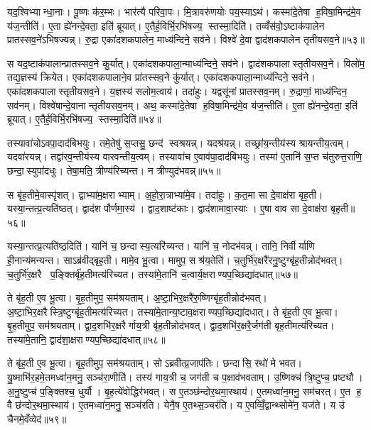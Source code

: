 यद॒श्विभ्यान्धा॒नाः। पू॒ष्णः क॑र॒म्भः। भार॑त्यै परिवा॒पः। मि॒त्रावरु॑णयोः पय॒स्याऽथ॑। कस्मा॑दे॒तेषा ह॒विषा॒मिन्द्र॑मे॒व य॑ज॒न्तीति॑। ए॒ता ह्ये॑नन्दे॒वता॒ इति॑ ब्रूयात्। ए॒तैर्\mbox{}ह॒विर्भि॒रभि॑षज्य॒ स्तस्मा॒दिति॑। तव्वँस॑वो॒ऽष्टाक॑पालेन प्रातस्सव॒ने॑ऽभिषज्यन्न्। रु॒द्रा एका॑दशकपालेन॒ माध्य॑न्दिने॒ सव॑ने। विश्वे॑ दे॒वा द्वाद॑शकपालेन तृतीयसव॒ने॥५३॥

स यद॒ष्टाक॑पालान्प्रातस्सव॒ने कु॒र्यात्। एका॑दशकपाला॒न्माध्य॑न्दिने॒ सव॑ने। द्वाद॑शकपालास्तृतीयसव॒ने। विलो॑म॒ तद्य॒ज्ञस्य॑ क्रियेत। एका॑दशकपालाने॒व प्रा॑तस्सव॒ने कु॑र्यात्। एका॑दशकपाला॒न्माध्य॑न्दिने॒ सव॑ने। एका॑दशकपालास्तृतीयसव॒ने। य॒ज्ञस्य॑ सलोम॒त्वाय॑। तदा॑हुः। यद्वसू॑नां प्रातस्सव॒नम्। रु॒द्राणां॒ माध्य॑न्दिन॒ सव॑नम्। विश्वे॑षान्दे॒वानान्तृतीयसव॒नम्। अथ॒ कस्मा॑दे॒तेषा ह॒विषा॒मिन्द्र॑मे॒व य॑ज॒न्तीति॑। ए॒ता ह्ये॑नन्दे॒वता॒ इति॑ ब्रूयात्। ए॒तैर्\mbox{}ह॒विर्भि॒रभि॑षज्य॒ स्तस्मा॒दिति॑॥५४॥\anuvakamend[ए॒क॒वि॒श आ॑हुस्तृतीयसव॒ने प्रा॑तस्सव॒नं पञ्च॑ च]

तस्यावा॑चोऽवपा॒दाद॑बिभयुः। तमे॒तेषु॑ स॒प्तसु॒ छन्द॑ स्वश्रयन्न्। यदश्र॑यन्न्। तच्छ्रा॑य॒न्तीय॑स्य श्रायन्तीय॒त्वम्। यदवा॑रयन्न्। तद्वा॑रव॒न्तीय॑स्य वारवन्तीय॒त्वम्। तस्यावा॑च ए॒वाव॑पा॒दाद॑बिभयुः। तस्मा॑ ए॒तानि॑ स॒प्त च॑तुरुत्त॒राणि॒ छन्दा॒स्युपा॑दधुः। तेषा॒मति॒ त्रीण्य॑रिच्यन्त। न त्रीण्युद॑भवन्न्॥५५॥

स बृ॑ह॒तीमे॒वास्पृ॑शत्। द्वाभ्या॑म॒क्षराभ्याम्। अ॒हो॒रा॒त्राभ्या॑मे॒व। तदा॑हुः। क॒त॒मा सा दे॒वाक्ष॑रा बृह॒ती। यस्या॒न्तत्प्र॒त्यति॑ष्ठत्। द्वाद॑श पौर्णमा॒स्य॑। द्वाद॒शाष्ट॑काः। द्वाद॑शामावा॒स्याः। ए॒षा वाव सा दे॒वाक्ष॑रा बृह॒ती॥५६॥

यस्या॒न्तत्प्र॒त्यति॑ष्ठ॒दिति॑। यानि॑ च॒ छन्दास्य॒त्यरि॑च्यन्त। यानि॑ च॒ नोदभ॑वन्न्। तानि॒ निर्वीर्याणि ही॒नान्य॑मन्यन्त। साऽब्र॑वीद्बृह॒ती। मामे॒व भू॒त्वा। मामुप॒ सश्र॑य॒तेति॑। च॒तुर्भि॑र॒क्षरै॑रनु॒ष्टुग्बृ॑ह॒तीन्नोद॑भवत्। च॒तुर्भि॑र॒क्षरै प॒ङ्क्तिर्बृ॑ह॒तीमत्य॑रिच्यत। तस्या॑मे॒तानि॑ च॒त्वार्य॒क्षराण्यप॒च्छिद्या॑दधात्॥५७॥

ते बृ॑ह॒ती ए॒व भू॒त्वा। बृ॒ह॒तीमुप॒ सम॑श्रयताम्। अ॒ष्टा॒भिर॒क्षरै॑रु॒ष्णिग्बृ॑ह॒तीन्नोद॑भवत्। अ॒ष्टा॒भिर॒क्षरैस्त्रि॒ष्टुग्बृ॑ह॒तीमत्य॑रिच्यत। तस्या॑मे॒तान्य॒ष्टाव॒क्षराण्यप॒च्छिद्या॑दधात्। ते बृ॑ह॒ती ए॒व भू॒त्वा। बृ॒ह॒तीमुप॒ सम॑श्रयताम्। द्वा॒द॒शभि॑र॒क्षरैर्गाय॒त्री बृ॑ह॒तीन्नोद॑भवत्। द्वा॒द॒शभि॑र॒क्षरै॒र्जग॑ती बृह॒तीमत्य॑रिच्यत। तस्या॑मे॒तानि॒ द्वाद॑शा॒क्षराण्यप॒च्छिद्या॑दधात्॥५८॥

ते बृ॑ह॒ती ए॒व भू॒त्वा। बृ॒ह॒तीमुप॒ सम॑श्रयताम्। सोऽब्रवीत्प्र॒जाप॑तिः। छन्दासि॒ रथो॑ मे भवत। यु॒ष्माभि॑र॒हमे॒तमध्वा॑न॒मनु॒ सञ्च॑रा॒णीति॑। तस्य॑ गाय॒त्री च॒ जग॑ती च प॒क्षाव॑भवताम्। उ॒ष्णिक्च॑ त्रि॒ष्टुप्च॒ प्रष्ट्यौ। अ॒नु॒ष्टुप्च॑ प॒ङ्क्तिश्च॒ धुर्यौ। बृ॒ह॒त्ये॑वोद्धिर॑भवत्। स ए॒तञ्छ॑न्दोर॒थमा॒स्थाय॑। ए॒तमध्वा॑न॒मनु॒ सम॑चरत्। ए॒त ह॒ वै छ॑न्दोर॒थमा॒स्थाय॑। ए॒तमध्वा॑न॒मनु॒ सञ्च॑रति। येनै॒ष ए॒तथ्स॒ञ्चर॑ति। य ए॒वव्विँ॒द्वान्थ्सोमे॑न॒ यज॑ते। य उ॑ चैनमे॒वँव्वेद॑॥५९॥\anuvakamend[अ॒भ॒व॒न्वाव सा दे॒वाक्ष॑रा बृह॒त्य॑दधा॒द्द्वाद॑शा॒क्षराण्यप॒च्छिद्या॑दधादा॒स्थाय॒ षट्च॑]

